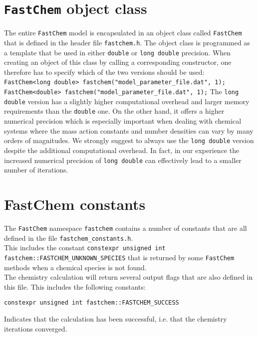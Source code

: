 \documentclass[numbers=noenddot]{fcmanual}
\newcommand{\fc}{\texttt{FastChem}\xspace}
\begin{document}
\section{\fc object class}

The entire \fc model is encapsulated in an object class called \fc that is defined in the header file \verb|fastchem.h|. The object class is programmed as a template that be used in either \verb|double| or \verb|long double| precision. When creating an object of this class by calling a corresponding constructor, one therefore has to specify which of the two versions should be used:
\bigbreak
\lstinline!  FastChem<long double> fastchem("model_parameter_file.dat", 1);!
\bigbreak
\lstinline!  FastChem<double> fastchem("model_parameter_file.dat", 1);!
\bigbreak
The \verb|long double| version has a slightly higher computational overhead and larger memory requirements than the \verb|double| one. On the other hand, it offers a higher numerical precision which is especially important when dealing with chemical systems where the mass action constants and number densities can vary by many orders of magnitudes. We strongly suggest to always use the \verb|long double| version despite the additional computational overhead. In fact, in our experience the increased numerical precision of \verb|long double| can effectively lead to a smaller number of iterations.


\section{FastChem constants}
\label{sec:fastchem_constants}

The \fc namespace \lstinline!fastchem! contains a number of constants that are all defined in the file \verb|fastchem_constants.h|.\\ This includes the constant \lstinline!constexpr unsigned int fastchem::FASTCHEM_UNKNOWN_SPECIES! that is returned by some \fc methods when a chemical species is not found. \\

The chemistry calculation will return several output flags that are also defined in this file. This includes the following constants:

\lstinline!constexpr unsigned int fastchem::FASTCHEM_SUCCESS!
\begin{addmargin}[25pt]{0pt}
  Indicates that the calculation has been successful, i.e. that the chemistry iterations converged.
\end{addmargin}
\end{document}
